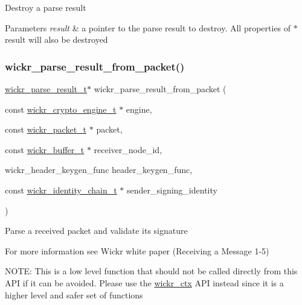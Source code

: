 Destroy a parse result


\begin{DoxyParams}{Parameters}
{\em result} & a pointer to the parse result to destroy. All properties of \textquotesingle{}$\ast$result\textquotesingle{} will also be destroyed \\
\hline
\end{DoxyParams}
\mbox{\label{group__wickr__protocol_ga1654ef299f9189b27e5e58485f1ffcf5}} 
\subsubsection{\texorpdfstring{wickr\+\_\+parse\+\_\+result\+\_\+from\+\_\+packet()}{wickr\_parse\_result\_from\_packet()}}
{\footnotesize\ttfamily \mbox{\hyperlink{structwickr__parse__result}{wickr\+\_\+parse\+\_\+result\+\_\+t}}$\ast$ wickr\+\_\+parse\+\_\+result\+\_\+from\+\_\+packet (\begin{DoxyParamCaption}\item[{const \mbox{\hyperlink{structwickr__crypto__engine}{wickr\+\_\+crypto\+\_\+engine\+\_\+t}} $\ast$}]{engine,  }\item[{const \mbox{\hyperlink{structwickr__packet}{wickr\+\_\+packet\+\_\+t}} $\ast$}]{packet,  }\item[{const \mbox{\hyperlink{structwickr__buffer}{wickr\+\_\+buffer\+\_\+t}} $\ast$}]{receiver\+\_\+node\+\_\+id,  }\item[{wickr\+\_\+header\+\_\+keygen\+\_\+func}]{header\+\_\+keygen\+\_\+func,  }\item[{const \mbox{\hyperlink{structwickr__identity__chain}{wickr\+\_\+identity\+\_\+chain\+\_\+t}} $\ast$}]{sender\+\_\+signing\+\_\+identity }\end{DoxyParamCaption})}

Parse a received packet and validate it\textquotesingle{}s signature

For more information see Wickr white paper (Receiving a Message 1-\/5)

N\+O\+TE\+: This is a low level function that should not be called directly from this A\+PI if it can be avoided. Please use the \textquotesingle{}\mbox{\hyperlink{structwickr__ctx}{wickr\+\_\+ctx}}\textquotesingle{} A\+PI instead since it is a higher level and safer set of functions


